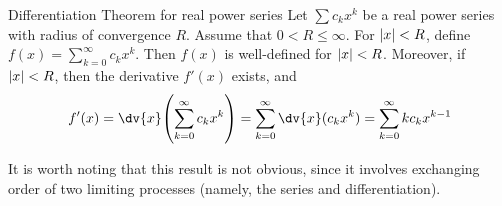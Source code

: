 \documentclass{styles/tufte}
\begin{document}
      \begin{theorem}{Differentiation Theorem for real power series}{}
        Let $\sum c_k x^k$ be a real power series with radius of convergence $R$. Assume that $0 < R \leqslant \infty$. For $\abs{x} < R$, define $f(x) = \sum_{k=0}^\infty c_k x^k$. Then $f(x)$ is well-defined for $\abs{x} < R$. Moreover, if $\abs{x} < R$, then the derivative $f'(x)$ exists, and
        \[ f'(x) = \dv{x} \left( \sum_{k=0}^\infty c_k x^k \right) = \sum_{k=0}^\infty \dv{x}(c_k x^k) = \sum_{k=0}^\infty kc_k x^{k-1} \]
      \end{theorem}
      
      It is worth noting that this result is not obvious, since it involves exchanging order of two limiting processes (namely, the series and differentiation).

  
\end{document}

